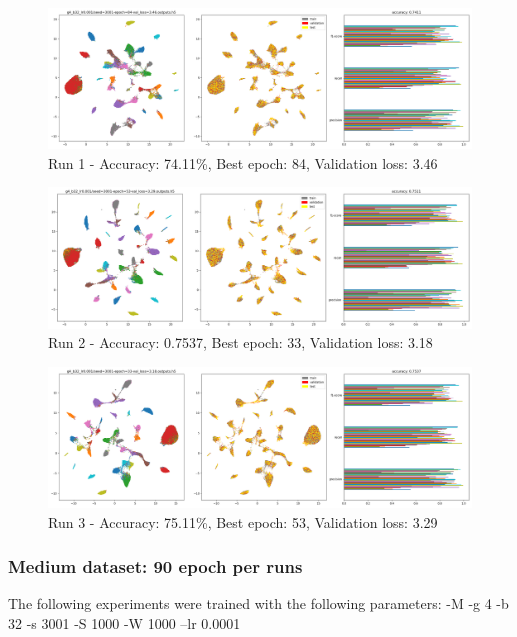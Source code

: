 \documentclass{article}
\begin{document}
\begin{figure}[h]
  \includegraphics[width=\linewidth]{new_journal/figures/experiments/roznet/medium/lr0.001/run1.png}
  \caption{Run 1 - Accuracy: 74.11\%, Best epoch: 84, Validation loss: 3.46}
\end{figure}

\begin{figure}[h]
  \includegraphics[width=\linewidth]{new_journal/figures/experiments/roznet/medium/lr0.001/run2.png}
  \caption{Run 2 - Accuracy: 0.7537, Best epoch: 33, Validation loss: 3.18}
\end{figure}

\begin{figure}[h]
  \includegraphics[width=\linewidth]{new_journal/figures/experiments/roznet/medium/lr0.001/run3.png}
  \caption{Run 3 - Accuracy: 75.11\%, Best epoch: 53, Validation loss: 3.29}
\end{figure}

\clearpage

\subsubsection*{Medium dataset: 90 epoch per runs}
The following experiments were trained with the following parameters: 
\newline
-M -g 4 -b 32 -s 3001 -S 1000 -W 1000 --lr 0.0001
\end{document}

